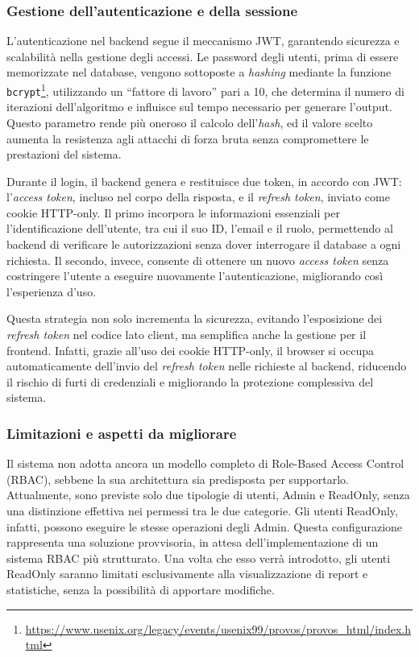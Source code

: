 \subsubsection{Gestione dell'autenticazione e della sessione}
L'autenticazione nel backend segue il meccanismo JWT, garantendo sicurezza e scalabilità nella gestione degli accessi. Le password degli utenti, prima di essere memorizzate nel database, vengono sottoposte a \textit{hashing} mediante la funzione \texttt{bcrypt}\footnote{\url{https://www.usenix.org/legacy/events/usenix99/provos/provos_html/index.html}}, utilizzando un ``fattore di lavoro'' pari a 10, che determina il numero di iterazioni dell'algoritmo e influisce sul tempo necessario per generare l'output. Questo parametro rende più oneroso il calcolo dell'\textit{hash}, ed il valore scelto aumenta la resistenza agli attacchi di forza bruta senza compromettere le prestazioni del sistema.

Durante il login, il backend genera e restituisce due token, in accordo con JWT: l'\textit{access token}, incluso nel corpo della risposta, e il \textit{refresh token}, inviato come cookie HTTP-only. Il primo incorpora le informazioni essenziali per l'identificazione dell'utente, tra cui il suo ID, l'email e il ruolo, permettendo al backend di verificare le autorizzazioni senza dover interrogare il database a ogni richiesta. Il secondo, invece, consente di ottenere un nuovo \textit{access token} senza costringere l'utente a eseguire nuovamente l'autenticazione, migliorando così l'esperienza d'uso.

Questa strategia non solo incrementa la sicurezza, evitando l’esposizione dei \textit{refresh token} nel codice lato client, ma semplifica anche la gestione per il frontend. Infatti, grazie all'uso dei cookie HTTP-only, il browser si occupa automaticamente dell'invio del \textit{refresh token} nelle richieste al backend, riducendo il rischio di furti di credenziali e migliorando la protezione complessiva del sistema.

\subsubsection{Limitazioni e aspetti da migliorare}
Il sistema non adotta ancora un modello completo di Role-Based Access Control (RBAC)\cite{DBLP:journals/compsec/Bertino03}, sebbene la sua architettura sia predisposta per supportarlo. Attualmente, sono previste solo due tipologie di utenti, Admin e ReadOnly, senza una distinzione effettiva nei permessi tra le due categorie. Gli utenti ReadOnly, infatti, possono eseguire le stesse operazioni degli Admin. Questa configurazione rappresenta una soluzione provvisoria, in attesa dell'implementazione di un sistema RBAC più strutturato. Una volta che esso verrà introdotto, gli utenti ReadOnly saranno limitati esclusivamente alla visualizzazione di report e statistiche, senza la possibilità di apportare modifiche.

